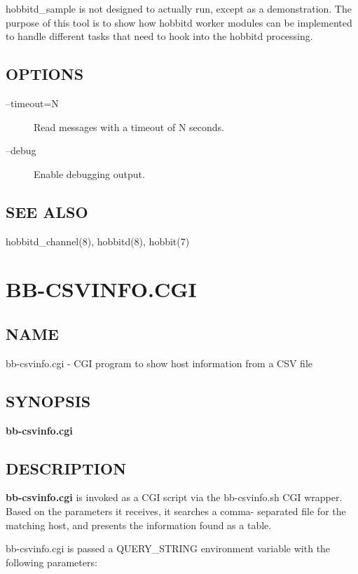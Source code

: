   hobbitd\_sample is not designed to actually run, except as a
  demonstration. The purpose of this tool is to show how hobbitd
  worker modules can be implemented to handle different tasks that
  need to hook into the hobbitd processing. 


 
\subsection{OPTIONS}
\begin{description}
\item[--timeout=N] Read messages with a timeout of N seconds. 

 

\item[--debug] Enable debugging output. 

 


\end{description}
\subsection{SEE ALSO}
hobbitd\_channel(8), hobbitd(8), hobbit(7) 


%
\newpage
\section{BB-CSVINFO.CGI}
\subsection{NAME}
 bb-csvinfo.cgi - CGI program to show host information from a CSV file \subsection{SYNOPSIS}
\textbf{bb-csvinfo.cgi}


 
\subsection{DESCRIPTION}
\textbf{bb-csvinfo.cgi}
 is invoked as a CGI script via the bb-csvinfo.sh CGI wrapper. Based
 on the parameters it receives, it searches a comma- separated file
 for the matching host, and presents the information found as a
 table. 


  bb-csvinfo.cgi is passed a QUERY\_STRING environment variable with
  the following parameters: 



